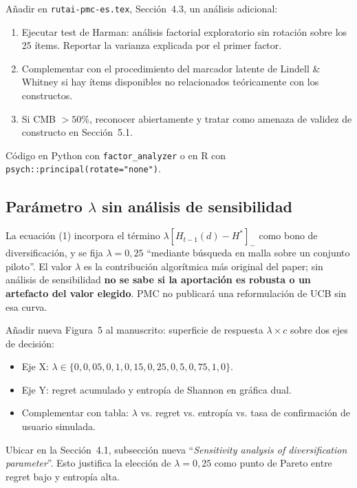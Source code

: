 \documentclass[11pt,a4paper]{article}
\begin{document}
\begin{abordaje}
A\~nadir en \texttt{rutai-pmc-es.tex}, Secci\'on~4.3, un an\'alisis adicional:

\begin{enumerate}
  \item Ejecutar test de Harman: an\'alisis factorial exploratorio sin rotaci\'on sobre los 25 \'items. Reportar la varianza explicada por el primer factor.
  \item Complementar con el procedimiento del marcador latente de Lindell \& Whitney si hay \'items disponibles no relacionados te\'oricamente con los constructos.
  \item Si CMB $>50\%$, reconocer abiertamente y tratar como amenaza de validez de constructo en Secci\'on~5.1.
\end{enumerate}

C\'odigo en Python con \texttt{factor\_analyzer} o en R con \texttt{psych::principal(rotate="none")}.
\end{abordaje}

\subsection{Par\'ametro \texorpdfstring{$\lambda$}{lambda} sin an\'alisis de sensibilidad}

\begin{deficiencia}[M.9 --- Deficiencia]
La ecuaci\'on (1) incorpora el t\'ermino $\lambda [H_{t-1}(d) - H^*]_-$ como bono de diversificaci\'on, y se fija $\lambda=0{,}25$ ``mediante b\'usqueda en malla sobre un conjunto piloto''. El valor $\lambda$ es la contribuci\'on algor\'itmica m\'as original del paper; sin an\'alisis de sensibilidad \textbf{no se sabe si la aportaci\'on es robusta o un artefacto del valor elegido}. PMC no publicar\'a una reformulaci\'on de UCB sin esa curva.
\end{deficiencia}

\begin{abordaje}
A\~nadir nueva Figura~5 al manuscrito: superficie de respuesta $\lambda \times c$ sobre dos ejes de decisi\'on:

\begin{itemize}
  \item Eje X: $\lambda \in \{0, 0{,}05, 0{,}1, 0{,}15, 0{,}25, 0{,}5, 0{,}75, 1{,}0\}$.
  \item Eje Y: regret acumulado y entrop\'ia de Shannon en gr\'afica dual.
  \item Complementar con tabla: $\lambda$ vs. regret vs. entrop\'ia vs. tasa de confirmaci\'on de usuario simulada.
\end{itemize}

Ubicar en la Secci\'on~4.1, subsecci\'on nueva ``\emph{Sensitivity analysis of diversification parameter}''. Esto justifica la elecci\'on de $\lambda=0{,}25$ como punto de Pareto entre regret bajo y entrop\'ia alta.
\end{abordaje}
\end{document}
